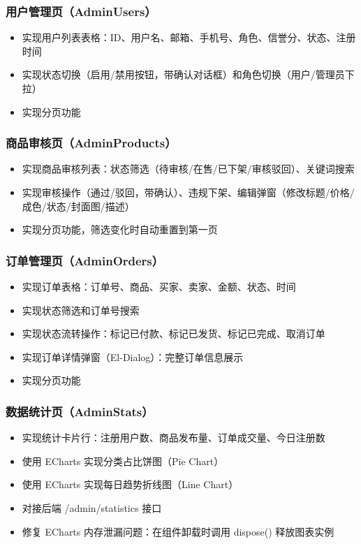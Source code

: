 \documentclass[12pt,a4paper]{ctexart}
\begin{document}
\subsubsection*{用户管理页（AdminUsers）}
\begin{itemize}
    \item 实现用户列表表格：ID、用户名、邮箱、手机号、角色、信誉分、状态、注册时间
    \item 实现状态切换（启用/禁用按钮，带确认对话框）和角色切换（用户/管理员下拉）
    \item 实现分页功能
\end{itemize}

\subsubsection*{商品审核页（AdminProducts）}
\begin{itemize}
    \item 实现商品审核列表：状态筛选（待审核/在售/已下架/审核驳回）、关键词搜索
    \item 实现审核操作（通过/驳回，带确认）、违规下架、编辑弹窗（修改标题/价格/成色/状态/封面图/描述）
    \item 实现分页功能，筛选变化时自动重置到第一页
\end{itemize}

\subsubsection*{订单管理页（AdminOrders）}
\begin{itemize}
    \item 实现订单表格：订单号、商品、买家、卖家、金额、状态、时间
    \item 实现状态筛选和订单号搜索
    \item 实现状态流转操作：标记已付款、标记已发货、标记已完成、取消订单
    \item 实现订单详情弹窗（El-Dialog）：完整订单信息展示
    \item 实现分页功能
\end{itemize}

\subsubsection*{数据统计页（AdminStats）}
\begin{itemize}
    \item 实现统计卡片行：注册用户数、商品发布量、订单成交量、今日注册数
    \item 使用 ECharts 实现分类占比饼图（Pie Chart）
    \item 使用 ECharts 实现每日趋势折线图（Line Chart）
    \item 对接后端 /admin/statistics 接口
    \item 修复 ECharts 内存泄漏问题：在组件卸载时调用 dispose() 释放图表实例
\end{itemize}
\end{document}
